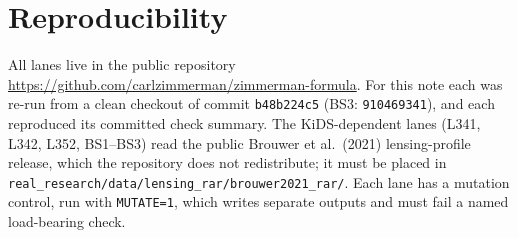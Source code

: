 \documentclass[10pt]{article}
\newcommand{\fpath}[1]{\nolinkurl{#1}}
\begin{document}
\section{Reproducibility}
All lanes live in the public repository \url{https://github.com/carlzimmerman/zimmerman-formula}. For this note each was re-run from a clean checkout of commit \texttt{b48b224c5} (BS3: \texttt{910469341}), and each reproduced its committed check summary. The KiDS-dependent lanes (L341, L342, L352, BS1--BS3) read the public Brouwer et al.\ (2021) lensing-profile release, which the repository does not redistribute; it must be placed in \fpath{real_research/data/lensing_rar/brouwer2021_rar/}. Each lane has a mutation control, run with \texttt{MUTATE=1}, which writes separate outputs and must fail a named load-bearing check.

\smallskip
\end{document}
